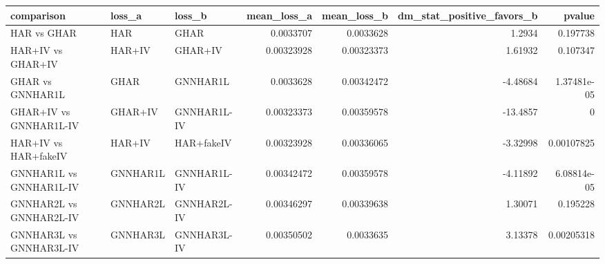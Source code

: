 \begin{tabular}{lllrrrr}
\toprule
comparison & loss_a & loss_b & mean_loss_a & mean_loss_b & dm_stat_positive_favors_b & pvalue \\
\midrule
HAR vs GHAR & HAR & GHAR & 0.0033707 & 0.0033628 & 1.2934 & 0.197738 \\
HAR+IV vs GHAR+IV & HAR+IV & GHAR+IV & 0.00323928 & 0.00323373 & 1.61932 & 0.107347 \\
GHAR vs GNNHAR1L & GHAR & GNNHAR1L & 0.0033628 & 0.00342472 & -4.48684 & 1.37481e-05 \\
GHAR+IV vs GNNHAR1L-IV & GHAR+IV & GNNHAR1L-IV & 0.00323373 & 0.00359578 & -13.4857 & 0 \\
HAR+IV vs HAR+fakeIV & HAR+IV & HAR+fakeIV & 0.00323928 & 0.00336065 & -3.32998 & 0.00107825 \\
GNNHAR1L vs GNNHAR1L-IV & GNNHAR1L & GNNHAR1L-IV & 0.00342472 & 0.00359578 & -4.11892 & 6.08814e-05 \\
GNNHAR2L vs GNNHAR2L-IV & GNNHAR2L & GNNHAR2L-IV & 0.00346297 & 0.00339638 & 1.30071 & 0.195228 \\
GNNHAR3L vs GNNHAR3L-IV & GNNHAR3L & GNNHAR3L-IV & 0.00350502 & 0.0033635 & 3.13378 & 0.00205318 \\
\bottomrule
\end{tabular}
